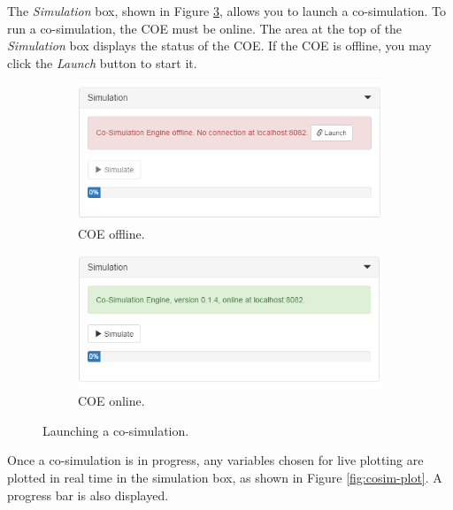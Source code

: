 The \textit{Simulation} box, shown in Figure \ref{fig:cosim-coe}, allows
you to launch a co-simulation. To run a co-simulation, the COE must be
online. The area at the top of the \textit{Simulation} box displays
the status of the COE. If the COE is offline, you may click the
\textit{Launch} button to start it.
%
%
%
\begin{figure}[ht]
\centering
\begin{subfigure}[b]{0.45\textwidth}
  \includegraphics[width=\textwidth]{figures/app/cosim-coe-offline}
  \caption{COE offline.}
  \label{fig:cosim-coe-offline}
\end{subfigure}
\quad 
\begin{subfigure}[b]{0.45\textwidth}
  \includegraphics[width=\textwidth]{figures/app/cosim-coe-online}
  \caption{COE online.} 
  \label{fig:cosim-coe-online}
\end{subfigure}
\caption{Launching a co-simulation.}
\label{fig:cosim-coe}
\end{figure}
%
%
%
Once a co-simulation is in progress, any variables chosen for live plotting are plotted in real time in the simulation box, as shown in Figure \ref{fig:cosim-plot}. A progress bar is also displayed.
%
%
%
